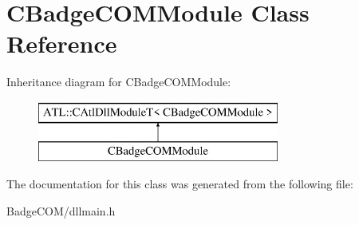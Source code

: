 \hypertarget{class_c_badge_c_o_m_module}{\section{C\-Badge\-C\-O\-M\-Module Class Reference}
\label{class_c_badge_c_o_m_module}
}
Inheritance diagram for C\-Badge\-C\-O\-M\-Module\-:\begin{figure}[H]
\begin{center}
\leavevmode
\includegraphics[height=2.000000cm]{class_c_badge_c_o_m_module}
\end{center}
\end{figure}


The documentation for this class was generated from the following file\-:\begin{DoxyCompactItemize}
\item 
Badge\-C\-O\-M/dllmain.\-h\end{DoxyCompactItemize}
